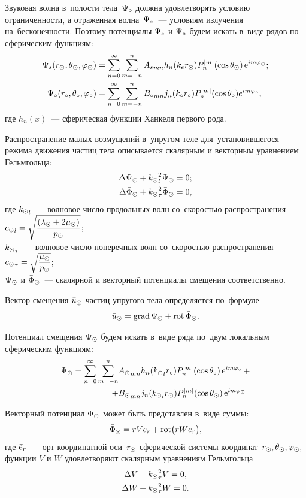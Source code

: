 Звуковая волна в~полости тела~$\P\c$ должна удовлетворять условию ограниченности, а отраженная волна~$\P\sc$~--- условиям излучения на~бесконечности. Поэтому потенциалы $\P\sc$ и $\P\c$ будем искать в~виде рядов по сферическим функциям:
\begin{align}\P\sc(r\s, \Q\s, \f\s) &= \sum\limits_{n = 0}^\infty \sum\limits_{m = -n}^n {A\sc}_{mn} h_n(k\en r\s) P_n^{\lvert m\rvert}(\cos\Q\s)\e^{im\f\s};\label{eq_psc}\\
\P\c(r\c, \Q\c, \f\c) &= \sum\limits_{n = 0}^\infty \sum\limits_{m = -n}^n {B\c}_{mn} j_n(k\c r\c) P_n^{\lvert m\rvert}(\cos\Q\c)e^{im\f\c},\label{eq_pc}
\end{align}
где $h_n(x)$~--- сферическая функции Ханкеля первого рода.

Распространение малых возмущений в~упругом теле для~установившегося режима движения частиц тела описывается скалярным и векторным уравнением Гельмгольца:
\begin{align}
\Lap\P\s &+ {k\s}_l^2\P\s = 0;\label{Helmholtz_scalar}\\
\Lap\F\s &+ {k\s}_\t^2\F\s = 0,\label{Helmholtz_vector}
\end{align}
где ${k\s}_l$~--- волновое число продольных волн со~скоростью распространения \break 
${c\s}_l = \sqrt{\df{(\la\s + 2\mu\s)}{p\s}}$;\\
${k\s}_\t$~--- волновое число поперечных волн со~скоростью распространения \\
${c\s}_\t = \sqrt{\df{\mu\s}{p\s}}$;\\
$\P\s$ и $\F\s$~--- скалярной и векторный потенциалы смещения соответственно.

Вектор смещения $\u\s$ частиц упругого тела определяется по~формуле
$$
\u\s = \grad \P\s + \rot \F\s.
$$

Потенциал смещения $\P\s$ будем искать в~виде ряда по~двум локальным сферическим функциям:
\begin{equation}\label{eq_ps}
\begin{split}
\P\s = \sum\limits_{n=0}^\infty \sum\limits_{m=-n}^n 
  &{A\s}_{mn} h_n({k\s}_lr\c)P_n^{\lvert m\rvert}(\cos\Q\c)\e^{im\f\c} +\\
+ &{B\s}_{mn} j_n({k\s}_lr\s)P_n^{\lvert m\rvert}(\cos\Q\s)\e^{im\f\s}
\end{split}
\end{equation}

Векторный потенциал $\F\s$ может быть представлен в~виде суммы:
$$
\F\s = rV\er + \rot\bigl(rW\er\bigr),
$$
где $\er$~--- орт координатной оси~$r\s$ сферической системы координат~$r\s, \Q\s, \f\s,$\\
функции $V$ и $W$ удовлетворяют скалярным уравнениям Гельмгольца
\begin{align}
\Lap V &+ {k\s}_\t^2 V = 0,\label{eq_V}\\
\Lap W &+ {k\s}_\t^2 W = 0.\label{eq_W}
\end{align}

